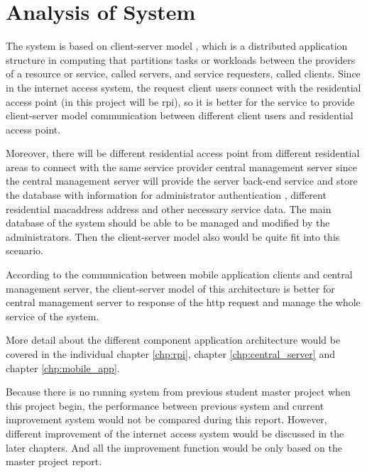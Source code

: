 \section{Analysis of System}
\par The system is based on client-server model \cite{csmodel}, which is a distributed application structure in computing that partitions tasks or workloads between the providers of a resource or service, called servers, and service requesters, called clients. Since in the internet access system, the request client users connect with the residential access point (in this project will be \gls{rpi}), so it is better for the service to provide client-server model communication between different client users and residential access point. \par Moreover, there will be different residential access point from different residential areas to connect with the same service provider central management server since the central management server will provide the server back-end service and store the database with information for administrator authentication , different residential \gls{macaddress} address and other necessary service data. The main database of the system should be able to be managed and modified by the administrators. Then the client-server model also would be quite fit into this scenario.
\par According to the communication between mobile application clients and central management server, the client-server model of this architecture is better for central management server to response of the \gls{http} request and manage the whole service of the system.
\par More detail about the different component application architecture would be covered in the individual chapter \ref{chp:rpi}, chapter \ref{chp:central_server} and chapter \ref{chp:mobile_app}.
\par Because there is no running system from previous student master project when this project begin, the performance between previous system and current improvement system would not be compared during this report. However, different improvement of the internet access system would be discussed in the later chapters. And all the improvement function would be only based on the master project report\cite{TorgeirMR}.